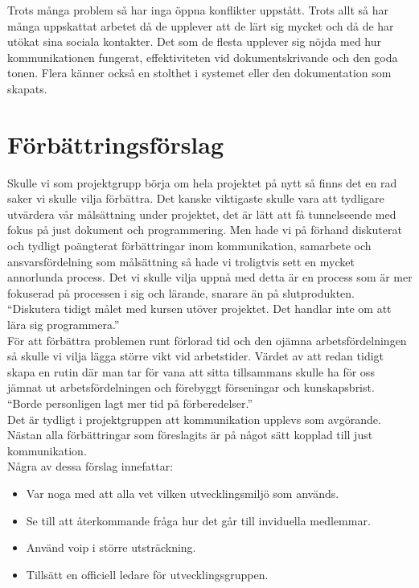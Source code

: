 \documentclass[paper=a4, fontsize=11pt,twoside]{article}
\begin{document}
Trots många problem så har inga öppna konflikter uppstått. Trots allt så har många 
uppskattat arbetet då de upplever att de lärt sig mycket och då de har utökat sina 
sociala kontakter. Det som de flesta upplever sig nöjda med hur kommunikationen fungerat, 
effektiviteten vid dokumentskrivande och den goda tonen. Flera känner också en stolthet 
i systemet eller den dokumentation som skapats.\\

\section{Förbättringsförslag}
Skulle vi som projektgrupp börja om hela projektet på nytt så finns det en rad saker 
vi skulle vilja förbättra. Det kanske viktigaste skulle vara att tydligare utvärdera 
vår målsättning under projektet, det är lätt att få tunnelseende med fokus på just 
dokument och programmering. Men hade vi på förhand diskuterat och tydligt poängterat 
förbättringar inom kommunikation, samarbete och ansvarsfördelning som målsättning 
så hade vi troligtvis sett en mycket annorlunda process. Det vi skulle vilja uppnå 
med detta är en process som är mer fokuserad på processen i sig och lärande, snarare 
än på slutprodukten.\\

``Diskutera tidigt målet med kursen utöver projektet. Det handlar inte om att
lära sig programmera.''\\

För att förbättra problemen runt förlorad tid och den ojämna arbetsfördelningen
så skulle vi vilja lägga större vikt vid arbetstider. Värdet av att redan 
tidigt skapa en rutin där man tar för vana att sitta tillsammans skulle 
ha för oss jämnat ut arbetsfördelningen och förebyggt förseningar och
kunskapsbrist.\\

``Borde personligen lagt mer tid på förberedelser.''\\

Det är tydligt i projektgruppen att kommunikation upplevs som avgörande. 
Nästan alla förbättringar som föreslagits är på något sätt kopplad till just 
kommunikation.\\

Några av dessa förslag innefattar:
\begin{itemize}
  \item Var noga med att alla vet vilken utvecklingsmiljö som används.
  \item Se till att återkommande fråga hur det går till inviduella medlemmar.
  \item Använd voip i större utsträckning.
  \item Tillsätt en officiell ledare för utvecklingsgruppen.
\end{itemize}
\newpage
\end{document}
